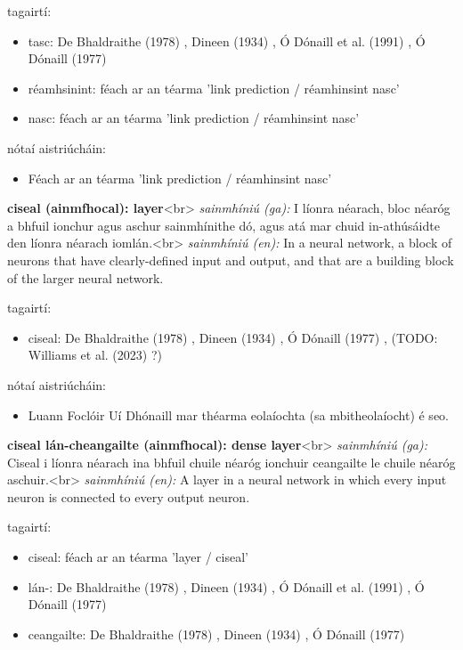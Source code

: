 \documentclass{article}
\begin{document}
tagairtí:
\begin{itemize}
	\item tasc: De Bhaldraithe (1978) \cite{de-bhaldraithe}, Dineen (1934) \cite{dineen}, Ó Dónaill et al. (1991) \cite{focloir-beag}, Ó Dónaill (1977) \cite{odonaill}
	\item réamhsinint: féach ar an téarma 'link prediction / réamhinsint nasc'
	\item nasc: féach ar an téarma 'link prediction / réamhinsint nasc'
\end{itemize}

nótaí aistriúcháin:
\begin{itemize}
	\item Féach ar an téarma 'link prediction / réamhinsint nasc'
\end{itemize}


\textbf{ciseal (ainmfhocal): layer}<br>
\textit{sainmhíniú (ga):} I líonra néarach, bloc néaróg a bhfuil ionchur agus aschur sainmhínithe dó, agus atá mar chuid in-athúsáidte den líonra néarach iomlán.<br>
\textit{sainmhíniú (en):} In a neural network, a block of neurons that have clearly-defined input and output, and that are a building block of the larger neural network.

tagairtí:
\begin{itemize}
	\item ciseal: De Bhaldraithe (1978) \cite{de-bhaldraithe}, Dineen (1934) \cite{dineen}, Ó Dónaill (1977) \cite{odonaill}, (TODO: Williams et al. (2023) \cite{storchiste}?)
\end{itemize}

nótaí aistriúcháin:
\begin{itemize}
	\item Luann Foclóir Uí Dhónaill mar théarma eolaíochta (sa mbitheolaíocht) é seo.
\end{itemize}


\textbf{ciseal lán-cheangailte (ainmfhocal): dense layer}<br>
\textit{sainmhíniú (ga):} Ciseal i líonra néarach ina bhfuil chuile néaróg ionchuir ceangailte le chuile néaróg aschuir.<br>
\textit{sainmhíniú (en):} A layer in a neural network in which every input neuron is connected to every output neuron.

tagairtí:
\begin{itemize}
	\item ciseal: féach ar an téarma 'layer / ciseal'
	\item lán-: De Bhaldraithe (1978) \cite{de-bhaldraithe}, Dineen (1934) \cite{dineen}, Ó Dónaill et al. (1991) \cite{focloir-beag}, Ó Dónaill (1977) \cite{odonaill}
	\item ceangailte: De Bhaldraithe (1978) \cite{de-bhaldraithe}, Dineen (1934) \cite{dineen}, Ó Dónaill (1977) \cite{odonaill}
\end{itemize}
\end{document}
